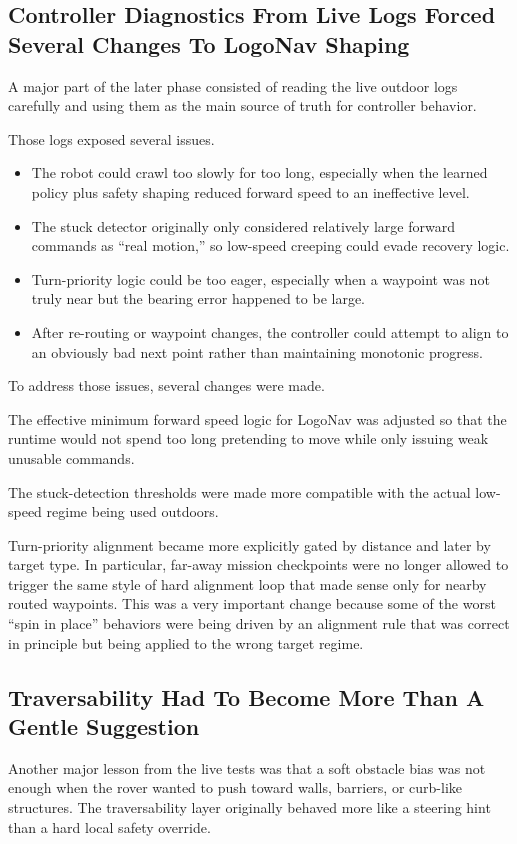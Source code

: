 \documentclass[11pt]{article}
\begin{document}
\subsection{Controller Diagnostics From Live Logs Forced Several Changes To LogoNav Shaping}
A major part of the later phase consisted of reading the live outdoor logs carefully and using them as the main source of truth for controller behavior.

Those logs exposed several issues.
\begin{itemize}[leftmargin=*]
\item The robot could crawl too slowly for too long, especially when the learned policy plus safety shaping reduced forward speed to an ineffective level.
\item The stuck detector originally only considered relatively large forward commands as ``real motion,'' so low-speed creeping could evade recovery logic.
\item Turn-priority logic could be too eager, especially when a waypoint was not truly near but the bearing error happened to be large.
\item After re-routing or waypoint changes, the controller could attempt to align to an obviously bad next point rather than maintaining monotonic progress.
\end{itemize}

To address those issues, several changes were made.

The effective minimum forward speed logic for LogoNav was adjusted so that the runtime would not spend too long pretending to move while only issuing weak unusable commands.

The stuck-detection thresholds were made more compatible with the actual low-speed regime being used outdoors.

Turn-priority alignment became more explicitly gated by distance and later by target type. In particular, far-away mission checkpoints were no longer allowed to trigger the same style of hard alignment loop that made sense only for nearby routed waypoints. This was a very important change because some of the worst ``spin in place'' behaviors were being driven by an alignment rule that was correct in principle but being applied to the wrong target regime.

\subsection{Traversability Had To Become More Than A Gentle Suggestion}
Another major lesson from the live tests was that a soft obstacle bias was not enough when the rover wanted to push toward walls, barriers, or curb-like structures. The traversability layer originally behaved more like a steering hint than a hard local safety override.
\end{document}
